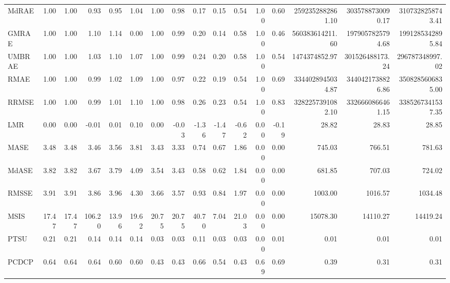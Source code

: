 \begin{tabular}{l|rrrrr|rrrrr|rrrrr}
MdRAE & 1.00 & 1.00 & 0.93 & 0.95 & 1.04 & 1.00 & 0.98 & 0.17 & 0.15 & 0.54 & 1.00 & 0.60 & 2592352882861.10 & 3035788730090.17 & 3107328258743.41 \\
GMRAE & 1.00 & 1.00 & 1.10 & 1.14 & 0.00 & 1.00 & 0.99 & 0.20 & 0.14 & 0.58 & 1.00 & 0.46 & 560383614211.60 & 1979057825794.68 & 1991285342895.84 \\
UMBRAE & 1.00 & 1.00 & 1.03 & 1.10 & 1.07 & 1.00 & 0.99 & 0.24 & 0.20 & 0.58 & 1.00 & 0.54 & 1474374852.97 & 301526488173.24 & 296787348997.02 \\
RMAE & 1.00 & 1.00 & 0.99 & 1.02 & 1.09 & 1.00 & 0.97 & 0.22 & 0.19 & 0.54 & 1.00 & 0.69 & 3344028945034.87 & 3440421738826.86 & 3508285606835.00 \\
RRMSE & 1.00 & 1.00 & 0.99 & 1.01 & 1.10 & 1.00 & 0.98 & 0.26 & 0.23 & 0.54 & 1.00 & 0.83 & 3282257391082.10 & 3326660866461.15 & 3385267341537.35 \\
LMR & 0.00 & 0.00 & -0.01 & 0.01 & 0.10 & 0.00 & -0.03 & -1.36 & -1.47 & -0.62 & 0.00 & -0.19 & 28.82 & 28.83 & 28.85 \\
MASE & 3.48 & 3.48 & 3.46 & 3.56 & 3.81 & 3.43 & 3.33 & 0.74 & 0.67 & 1.86 & 0.00 & 0.00 & 745.03 & 766.51 & 781.63 \\
MdASE & 3.82 & 3.82 & 3.67 & 3.79 & 4.09 & 3.54 & 3.43 & 0.58 & 0.62 & 1.84 & 0.00 & 0.00 & 681.85 & 707.03 & 724.02 \\
RMSSE & 3.91 & 3.91 & 3.86 & 3.96 & 4.30 & 3.66 & 3.57 & 0.93 & 0.84 & 1.97 & 0.00 & 0.00 & 1003.00 & 1016.57 & 1034.48 \\
MSIS & 17.47 & 17.47 & 106.20 & 13.96 & 19.62 & 20.75 & 20.75 & 40.70 & 7.04 & 21.03 & 0.00 & 0.00 & 15078.30 & 14110.27 & 14419.24 \\
PTSU & 0.21 & 0.21 & 0.14 & 0.14 & 0.14 & 0.03 & 0.03 & 0.11 & 0.03 & 0.03 & 0.00 & 0.01 & 0.01 & 0.01 & 0.01 \\
PCDCP & 0.64 & 0.64 & 0.64 & 0.60 & 0.60 & 0.43 & 0.43 & 0.66 & 0.54 & 0.43 & 0.69 & 0.69 & 0.39 & 0.31 & 0.31 \\
\bottomrule
\end{tabular}
